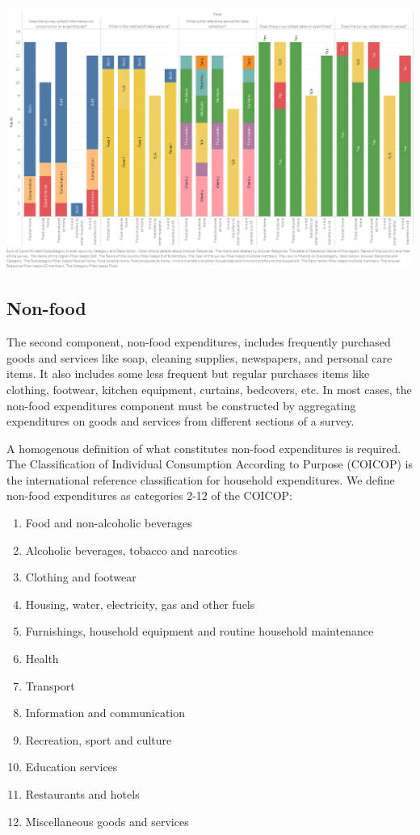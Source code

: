 \documentclass[13 pt,]{book}
\providecommand{\tightlist}{%
  \setlength{\itemsep}{0pt}\setlength{\parskip}{0pt}}
\begin{document}
\href{https://tab.worldbank.org/\#/site/WBG/views/SAR_MNA_Metadata/Food}{\includegraphics{figures/Food.png}}

\subsection{Non-food}\label{non-food}

The second component, non-food expenditures, includes frequently
purchased goods and services like soap, cleaning supplies, newspapers,
and personal care items. It also includes some less frequent but regular
purchases items like clothing, footwear, kitchen equipment, curtains,
bedcovers, etc. In most cases, the non-food expenditures component must
be constructed by aggregating expenditures on goods and services from
different sections of a survey.

A homogenous definition of what constitutes non-food expenditures is
required. The Classification of Individual Consumption According to
Purpose (COICOP) is the international reference classification for
household expenditures. We define non-food expenditures as categories
2-12 of the COICOP:

\begin{enumerate}
\def\labelenumi{\arabic{enumi}.}
\tightlist
\item
  Food and non-alcoholic beverages
\item
  Alcoholic beverages, tobacco and narcotics
\item
  Clothing and footwear
\item
  Housing, water, electricity, gas and other fuels
\item
  Furnishings, household equipment and routine household maintenance
\item
  Health
\item
  Transport
\item
  Information and communication
\item
  Recreation, sport and culture
\item
  Education services
\item
  Restaurants and hotels
\item
  Miscellaneous goods and services
\end{enumerate}
\end{document}

